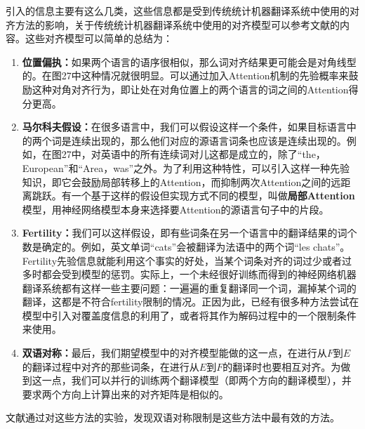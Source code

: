 \documentclass[10pt,a4paper]{ctexart}
\begin{document}
引入的信息主要有这么几类，这些信息都是受到传统统计机器翻译系统中使用的对齐方法的影响，关于传统统计机器翻译系统中使用的对齐模型可以参考文献\cite{brown1993mathematics}的内容。这些对齐模型可以简单的总结为：
\begin{enumerate}
\item[] \textbf{位置偏执：}如果两个语言的语序很相似，那么词对齐结果更可能会是对角线型的。在图27中这种情况就很明显。可以通过加入Attention机制的先验概率来鼓励这种对角对齐行为，即让处在对角位置上的两个语言的词之间的Attention得分更高。
\item[] \textbf{马尔科夫假设：}在很多语言中，我们可以假设这样一个条件，如果目标语言中的两个词是连续出现的，那么他们对应的源语言词条也应该是连续出现的。例如，在图27中，对英语中的所有连续词对儿这都是成立的，除了“the，European”和“Area，was”之外。为了利用这种特性，可以引入这样一种先验知识，即它会鼓励局部转移上的Attention，而抑制两次Attention之间的远距离跳跃。有一个基于这样的假设但实现方式不同的模型，叫做\textbf{局部Attention}模型\cite{luong2015effective}，用神经网络模型本身来选择要Attention的源语言句子中的片段。
\item[] \textbf{Fertility：}我们可以这样假设，即有些词条在另一个语言中的翻译结果的词个数是确定的。例如，英文单词“cats”会被翻译为法语中的两个词“les chats”。Fertility先验信息就能利用这个事实的好处，当某个词条对齐的词过少或者过多时都会受到模型的惩罚。实际上，一个未经很好训练而得到的神经网络机器翻译系统都有这样一些主要问题：一遍遍的重复翻译同一个词，漏掉某个词的翻译，这都是不符合fertility限制的情况。正因为此，已经有很多种方法尝试在模型中引入对覆盖度信息的利用了\cite{tu2016modeling,mi2016coverage}，或者将其作为解码过程中的一个限制条件来使用\cite{wu2016google}。
\item[] \textbf{双语对称：}最后，我们期望模型中的对齐模型能做的这一点，在进行从$F$到$E$的翻译过程中对齐的那些词条，在进行从$E$到$F$的翻译时也要相互对齐。为做到这一点，我们可以并行的训练两个翻译模型（即两个方向的翻译模型），并要求两个方向上计算出来的对齐矩阵是相似的。
\end{enumerate}
文献\cite{cohn2016incorporating}通过对这些方法的实验，发现双语对称限制是这些方法中最有效的方法。
\end{document}
